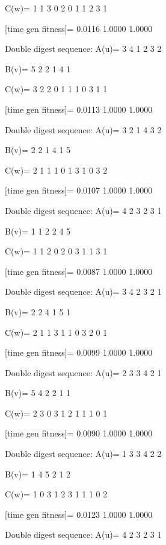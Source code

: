 C(w)=
     1     1     3     0     2     0     1     1     2     3     1

[time gen fitness]=
    0.0116    1.0000    1.0000

Double digest sequence:
A(u)=
     3     4     1     2     3     2

B(v)=
     5     2     2     1     4     1

C(w)=
     3     2     2     0     1     1     1     0     3     1     1

[time gen fitness]=
    0.0113    1.0000    1.0000

Double digest sequence:
A(u)=
     3     2     1     4     3     2

B(v)=
     2     2     1     4     1     5

C(w)=
     2     1     1     1     0     1     3     1     0     3     2

[time gen fitness]=
    0.0107    1.0000    1.0000

Double digest sequence:
A(u)=
     4     2     3     2     3     1

B(v)=
     1     1     2     2     4     5

C(w)=
     1     1     2     0     2     0     3     1     1     3     1

[time gen fitness]=
    0.0087    1.0000    1.0000

Double digest sequence:
A(u)=
     3     4     2     3     2     1

B(v)=
     2     2     4     1     5     1

C(w)=
     2     1     1     3     1     1     0     3     2     0     1

[time gen fitness]=
    0.0099    1.0000    1.0000

Double digest sequence:
A(u)=
     2     3     3     4     2     1

B(v)=
     5     4     2     2     1     1

C(w)=
     2     3     0     3     1     2     1     1     1     0     1

[time gen fitness]=
    0.0090    1.0000    1.0000

Double digest sequence:
A(u)=
     1     3     3     4     2     2

B(v)=
     1     4     5     2     1     2

C(w)=
     1     0     3     1     2     3     1     1     1     0     2

[time gen fitness]=
    0.0123    1.0000    1.0000

Double digest sequence:
A(u)=
     4     2     3     2     3     1

